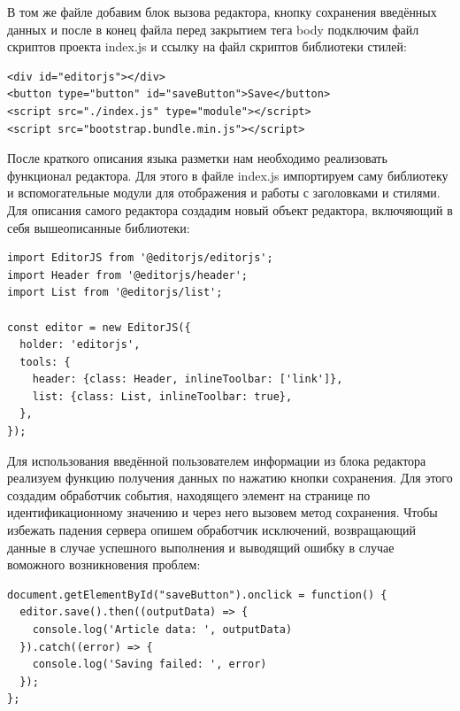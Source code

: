 \documentclass[master, och, coursework]{SCWorks}
\begin{document}
В том же файле добавим блок вызова редактора, кнопку сохранения введённых данных 
и после в конец файла перед закрытием тега body подключим файл скриптов 
проекта index.js и ссылку на файл скриптов библиотеки стилей:
\begin{verbatim}
<div id="editorjs"></div>
<button type="button" id="saveButton">Save</button>
<script src="./index.js" type="module"></script>
<script src="bootstrap.bundle.min.js"></script>
\end{verbatim}


После краткого описания языка разметки нам необходимо реализовать функционал редактора.
Для этого в файле index.js импортируем саму библиотеку и вспомогательные модули для 
отображения и работы с заголовками и стилями. Для описания самого редактора создадим
новый объект редактора, включяющий в себя вышеописанные библиотеки:
\begin{verbatim}
import EditorJS from '@editorjs/editorjs'; 
import Header from '@editorjs/header'; 
import List from '@editorjs/list'; 

const editor = new EditorJS({ 
  holder: 'editorjs', 
  tools: { 
    header: {class: Header, inlineToolbar: ['link']}, 
    list: {class: List, inlineToolbar: true},
  }, 
});
\end{verbatim}


Для использования введённой пользователем информации из блока редактора реализуем функцию
получения данных по нажатию кнопки сохранения. Для этого создадим обработчик события,
находящего элемент на странице по идентификационному значению и через него вызовем 
метод сохранения. Чтобы избежать падения сервера опишем обработчик исключений, возвращающий
данные в случае успешного выполнения и выводящий ошибку в случае воможного возникновения
проблем:
\begin{verbatim}
document.getElementById("saveButton").onclick = function() {
  editor.save().then((outputData) => {
    console.log('Article data: ', outputData)
  }).catch((error) => {
    console.log('Saving failed: ', error)
  });
};   
\end{verbatim}
\end{document}
